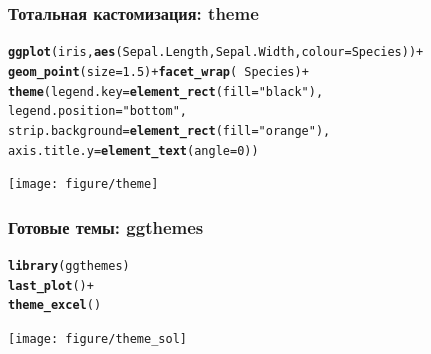 \documentclass[compress]{beamer}\usepackage[]{graphicx}\usepackage[]{color}
\makeatletter
\newcommand{\hlnum}[1]{\textcolor[rgb]{0.686,0.059,0.569}{#1}}%
\newcommand{\hlstr}[1]{\textcolor[rgb]{0.192,0.494,0.8}{#1}}%
\newcommand{\hlopt}[1]{\textcolor[rgb]{0,0,0}{#1}}%
\newcommand{\hlstd}[1]{\textcolor[rgb]{0.345,0.345,0.345}{#1}}%
\newcommand{\hlkwc}[1]{\textcolor[rgb]{0.333,0.667,0.333}{#1}}%
\newcommand{\hlkwd}[1]{\textcolor[rgb]{0.737,0.353,0.396}{\textbf{#1}}}%
\newenvironment{kframe}{%
 \def\at@end@of@kframe{}%
 \ifinner\ifhmode%
  \def\at@end@of@kframe{\end{minipage}}%
  \begin{minipage}{\columnwidth}%
 \fi\fi%
 \def\FrameCommand##1{\hskip\@totalleftmargin \hskip-\fboxsep
 \colorbox{shadecolor}{##1}\hskip-\fboxsep
     \hskip-\linewidth \hskip-\@totalleftmargin \hskip\columnwidth}%
 \MakeFramed {\advance\hsize-\width
   \@totalleftmargin\z@ \linewidth\hsize
   \@setminipage}}%
 {\par\unskip\endMakeFramed%
 \at@end@of@kframe}
\newenvironment{knitrout}{}{} %
\makeatother
\begin{document}
\begin{frame}[fragile]
\frametitle{Тотальная кастомизация: theme}
\begin{knitrout}\footnotesize
{}\color{fgcolor}\begin{kframe}
\begin{alltt}
\hlkwd{ggplot}\hlstd{(iris,} \hlkwd{aes}\hlstd{(Sepal.Length, Sepal.Width,} \hlkwc{colour} \hlstd{= Species))} \hlopt{+}
  \hlkwd{geom_point}\hlstd{(}\hlkwc{size} \hlstd{=} \hlnum{1.5}\hlstd{)} \hlopt{+} \hlkwd{facet_wrap}\hlstd{(} \hlopt{~} \hlstd{Species)} \hlopt{+}
  \hlkwd{theme}\hlstd{(}\hlkwc{legend.key} \hlstd{=} \hlkwd{element_rect}\hlstd{(}\hlkwc{fill} \hlstd{=} \hlstr{"black"}\hlstd{),}
    \hlkwc{legend.position} \hlstd{=} \hlstr{"bottom"}\hlstd{,}
    \hlkwc{strip.background} \hlstd{=} \hlkwd{element_rect}\hlstd{(}\hlkwc{fill} \hlstd{=} \hlstr{"orange"}\hlstd{),}
    \hlkwc{axis.title.y} \hlstd{=} \hlkwd{element_text}\hlstd{(}\hlkwc{angle} \hlstd{=} \hlnum{0}\hlstd{))}
\end{alltt}
\end{kframe}
\texttt{[image: figure/theme]} 

\end{knitrout}

\end{frame}

\begin{frame}[fragile]
\frametitle{Готовые темы: ggthemes}
\begin{knitrout}\footnotesize
{}\color{fgcolor}\begin{kframe}
\begin{alltt}
\hlkwd{library}\hlstd{(ggthemes)}
\hlkwd{last_plot}\hlstd{()} \hlopt{+}
  \hlkwd{theme_excel}\hlstd{()}
\end{alltt}
\end{kframe}
\texttt{[image: figure/theme\_sol]} 

\end{knitrout}

\end{frame}
\end{document}
